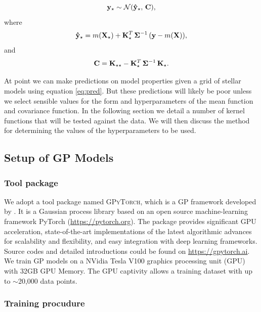 \begin{equation}
{\bf y}_{\star} \sim \mathcal{N}(\bf \hat{y}_{\star}, \, \bf C),
\label{eq:pred}
\end{equation}
where 
\begin{equation}
{\bf \hat{y}}_{\star} = m({\bf X}_{\star}) + {\bf K}_{\star}^{T} \, {\bf \Sigma}^{-1} \, ({\bf y} - m(\bf X)),
\end{equation}
and 
\begin{equation}
{\bf C} = {\bf K}_{\star \star} - {\bf K}_{\star}^{T} \, {\bf \Sigma}^{-1} \, {\bf K_{\star}}.
\end{equation}

At point we can make predictions on model properties given a grid of stellar models using equation \ref{eq:pred}.  But these predictions will likely be poor unless we select sensible values for the form and hyperparameters of the mean function and covariance function.  In the following section we detail a number of kernel functions that will be tested against the data.  We will then discuss the method for determining the values of the hyperparameters to be used.


\subsection{Setup of GP Models}\label{sec:setup}

\subsubsection{Tool package}

We adopt a tool package named \textsc{GPyTorch}, which is a GP framework developed by \citet{gardner2018gpytorch}. It is a Gaussian process library based on an open source machine-learning framework PyTorch (\url{https://pytorch.org}). The package provides significant GPU acceleration, state-of-the-art implementations of the latest algorithmic advances for scalability and flexibility, and easy integration with deep learning frameworks. Source codes and detailed introductions could be found on \url{https://gpytorch.ai}. 
%
We train GP models on a NVidia Tesla V100 graphics processing unit (GPU) with 32GB GPU Memory. The GPU captivity allows a training dataset with up to $\sim$20,000 data points. 


\subsubsection{Training procudure}

